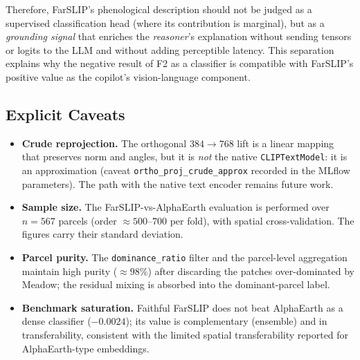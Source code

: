 Therefore, FarSLIP's phenological description should not be judged as a supervised
classification head (where its contribution is marginal), but as a
\textit{grounding signal} that enriches the \textit{reasoner}'s explanation
without sending tensors or logits to the LLM and without adding perceptible
latency. This separation explains why the negative result of F2 as a classifier
is compatible with FarSLIP's positive value as the copilot's vision-language
component.

\subsection{Explicit Caveats}
\label{sec:farslip_caveats}

\begin{itemize}[leftmargin=*]
    \item \textbf{Crude reprojection.} The orthogonal $384\rightarrow768$ lift is
    a linear mapping that preserves norm and angles, but it is \textit{not} the
    native \texttt{CLIPTextModel}: it is an approximation (caveat
    \texttt{ortho\_proj\_crude\_approx} recorded in the MLflow parameters). The
    path with the native text encoder remains future work.
    \item \textbf{Sample size.} The FarSLIP-vs-AlphaEarth evaluation is performed
    over $n=567$ parcels (order $\approx500$--$700$ per fold), with spatial
    cross-validation. The figures carry their standard deviation.
    \item \textbf{Parcel purity.} The \texttt{dominance\_ratio} filter and the
    parcel-level aggregation maintain high purity ($\approx98\%$) after
    discarding the patches over-dominated by Meadow; the residual mixing is
    absorbed into the dominant-parcel label.
    \item \textbf{Benchmark saturation.} Faithful FarSLIP does not beat AlphaEarth
    as a dense classifier ($-0.0024$); its value is complementary (ensemble) and
    in transferability, consistent with the limited spatial transferability
    reported for AlphaEarth-type embeddings.
\end{itemize}
